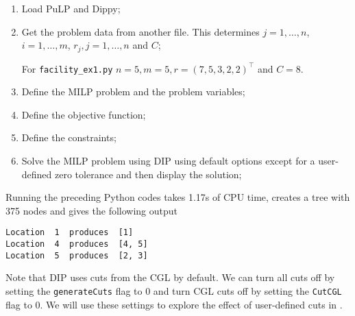 \begin{enumerate}
\item Load PuLP and Dippy;


\item Get the problem data from another file. This determines $j=1, \ldots, n$, $i = 1, \ldots, m$, $r_j, j = 1, \ldots, n$ and $C$;

For {\tt facility\_ex1.py} $n = 5, m = 5, r = (7, 5, 3, 2, 2)^\top$ and $C = 8$.

\item Define the \ac{MILP} problem and the problem variables;


\item Define the objective function;


\item Define the constraints; 

\item Solve the \ac{MILP} problem using \ac{DIP} using default options except for a user-defined zero tolerance and then display the solution;

\end{enumerate}
Running the preceding Python codes takes 1.17s of CPU time, creates a tree with 375 nodes and gives the following output
\begin{verbatim}
Location  1  produces  [1]
Location  4  produces  [4, 5]
Location  5  produces  [2, 3]
\end{verbatim}

Note that \ac{DIP} uses cuts from the \ac{CGL} \cite{coin_or} by default. We can turn all cuts off by setting the {\tt generateCuts} flag to 0 and turn \ac{CGL} cuts off by setting the {\tt CutCGL} flag to 0. We will use these settings to explore the effect of user-defined cuts in .
